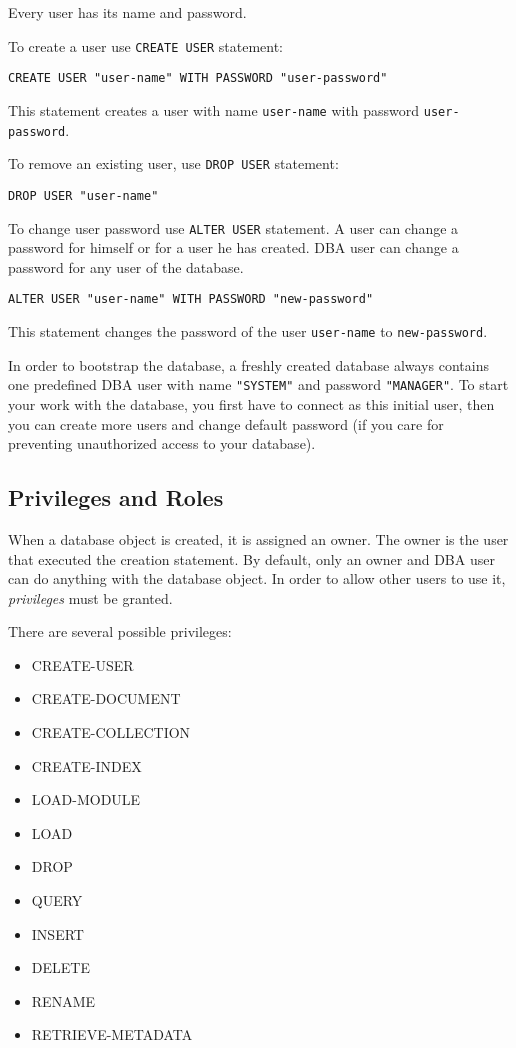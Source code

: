 \documentclass[a4paper,12pt]{article}
\begin{document}
Every user has its name and password.

To create a user use \verb!CREATE USER! statement:

\begin{verbatim}
CREATE USER "user-name" WITH PASSWORD "user-password"
\end{verbatim}

This statement creates a user with name \verb!user-name! with password \verb!user-password!.

To remove an existing user, use \verb!DROP USER! statement:

\begin{verbatim}
DROP USER "user-name"
\end{verbatim}

To change user password use \verb!ALTER USER! statement. A user can change a password for himself or for a user he has created. DBA user can change a password for any user of the database.

\begin{verbatim}
ALTER USER "user-name" WITH PASSWORD "new-password"
\end{verbatim}

This statement changes the password of the user \verb!user-name! to \verb!new-password!.

In order to bootstrap the database, a freshly created database always contains one predefined DBA user with name \verb!"SYSTEM"! and password \verb!"MANAGER"!. To start your work with the database, you first have to connect as this initial user, then you can create more users and change default password (if you care for preventing unauthorized access to your database).

\subsection{Privileges and Roles}
\label{roles}

When a database object is created, it is assigned an owner. The owner is the user that executed the creation statement. By default, only an owner and DBA user can do anything with the database object. In order to allow other users to use it, \emph{privileges} must be granted.

There are several possible privileges: 
\begin{itemize}
\item CREATE-USER
\item CREATE-DOCUMENT
\item CREATE-COLLECTION
\item CREATE-INDEX
\item LOAD-MODULE
\item LOAD
\item DROP
\item QUERY
\item INSERT
\item DELETE
\item RENAME
\item RETRIEVE-METADATA
\end{itemize}
\end{document}
